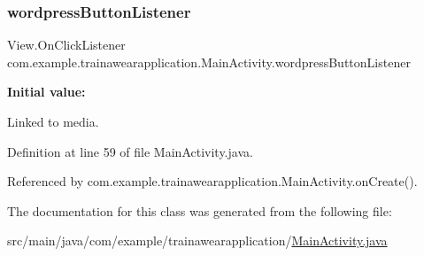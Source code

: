 \subsubsection{\texorpdfstring{wordpressButtonListener}{wordpressButtonListener}}
{\footnotesize\ttfamily View.\+On\+Click\+Listener com.\+example.\+trainawearapplication.\+Main\+Activity.\+wordpress\+Button\+Listener\hspace{0.3cm}{\ttfamily [private]}}

{\bfseries Initial value\+:}
\begin{DoxyCode}{0}
\DoxyCodeLine{        \}}
\DoxyCodeLine{    \}}

\end{DoxyCode}


Linked to media. 



Definition at line 59 of file Main\+Activity.\+java.



Referenced by com.\+example.\+trainawearapplication.\+Main\+Activity.\+on\+Create().



The documentation for this class was generated from the following file\+:\begin{DoxyCompactItemize}
\item 
src/main/java/com/example/trainawearapplication/\mbox{\hyperlink{_main_activity_8java}{Main\+Activity.\+java}}\end{DoxyCompactItemize}
